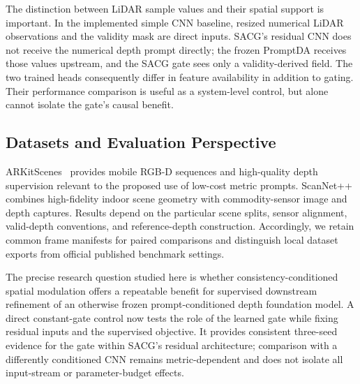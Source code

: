 The distinction between LiDAR sample values and their spatial support is important. In the implemented simple CNN baseline, resized numerical LiDAR observations and the validity mask are direct inputs. SACG's residual CNN does not receive the numerical depth prompt directly; the frozen PromptDA receives those values upstream, and the SACG gate sees only a validity-derived field. The two trained heads consequently differ in feature availability in addition to gating. Their performance comparison is useful as a system-level control, but alone cannot isolate the gate's causal benefit.

\subsection{Datasets and Evaluation Perspective}
ARKitScenes~\cite{baruch2021arkitscenes} provides mobile RGB-D sequences and high-quality depth supervision relevant to the proposed use of low-cost metric prompts. ScanNet++~\cite{yeshwanth2023scannetpp} combines high-fidelity indoor scene geometry with commodity-sensor image and depth captures. Results depend on the particular scene splits, sensor alignment, valid-depth conventions, and reference-depth construction. Accordingly, we retain common frame manifests for paired comparisons and distinguish local dataset exports from official published benchmark settings.

The precise research question studied here is whether consistency-conditioned spatial modulation offers a repeatable benefit for supervised downstream refinement of an otherwise frozen prompt-conditioned depth foundation model. A direct constant-gate control now tests the role of the learned gate while fixing residual inputs and the supervised objective. It provides consistent three-seed evidence for the gate within SACG's residual architecture; comparison with a differently conditioned CNN remains metric-dependent and does not isolate all input-stream or parameter-budget effects.
